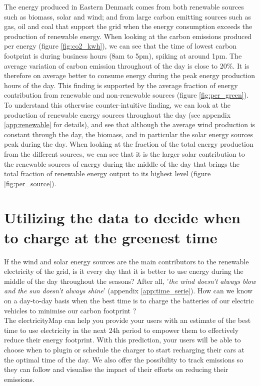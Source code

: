 \documentclass[11pt]{article} %
\begin{document}
The energy produced in Eastern Denmark comes from both renewable sources such as biomass, solar and wind; and from large carbon emitting sources such as gas, oil and coal that support the grid when the energy consumption exceeds the production of renewable energy.
When looking at the carbon emissions produced per energy (figure \ref{fig:co2_kwh}), we can see that the time of lowest carbon footprint is during business hours (8am to 5pm), spiking at around 1pm. The average variation of carbon emission throughout of the day is close to 20\%. It is therefore on average better to consume energy during the peak energy production hours of the day. This finding is supported by the average fraction of energy contribution from renewable and non-renewable sources (figure \ref{fig:per_green}).\\

To understand this otherwise counter-intuitive finding, we can look at the production of renewable energy sources throughout the day (see appendix \ref{app:renewable} for details), and see that although the average wind production is constant through the day, the biomass, and in particular the solar energy sources peak during the day. When looking at the fraction of the total energy production from the different sources, we can see that it is the larger solar contribution to the renewable sources of energy during the middle of the day that brings the total fraction of renewable energy output to its highest level (figure \ref{fig:per_source}).

\clearpage\newpage
\section{Utilizing the data to decide when to charge at the greenest time}
If the wind and solar energy sources are the main contributors to the renewable electricity of the grid, is it every day that it is better to use energy during the middle of the day throughout the seasons? After all, '\textit{the wind doesn't always blow and the sun doesn't always shine}' (appendix \ref{app:time_serie}). How can we know on a day-to-day basis when the best time is to charge the batteries of our electric vehicles to minimise our carbon footprint ?  \\

The electricityMap can help you provide your users with an estimate of the best time to use electricity in the next 24h period to empower them to effectively reduce their energy footprint. With this prediction, your users will be able to choose when to plugin  or schedule the charger to start recharging their cars at the optimal time of the day. We also offer the possibility to track emissions so they can follow and visualise the impact of their efforts on reducing their emissions.
\end{document}
